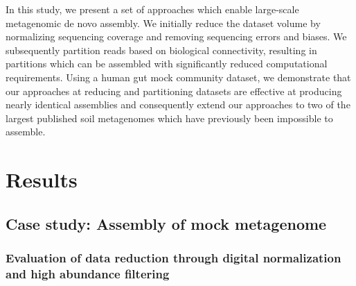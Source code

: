\documentclass[11pt]{article} %
\begin{document}
In this study, we present a set of approaches which enable large-scale metagenomic de novo assembly.  We initially reduce the dataset volume by normalizing sequencing coverage and removing sequencing errors and biases.  We subsequently partition reads based on biological connectivity, resulting in partitions which can be assembled with significantly reduced computational requirements.   Using a human gut mock community dataset, we demonstrate that our approaches at reducing and partitioning datasets are effective at producing nearly identical assemblies and consequently extend our approaches to two of the largest published soil metagenomes which have previously been impossible to assemble. 

\section{Results}

\subsection{Case study:  Assembly of mock metagenome}

\subsubsection{Evaluation of data reduction through digital normalization and high abundance filtering}
\end{document}
